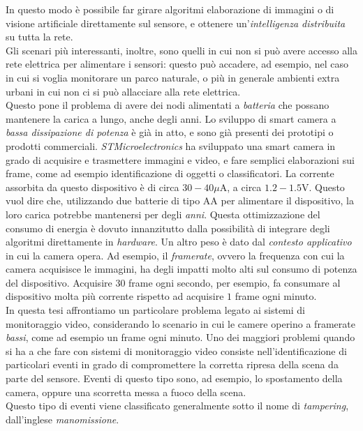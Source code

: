 In questo modo \`e possibile far girare algoritmi elaborazione di immagini o di visione artificiale direttamente sul sensore, e ottenere un'\textit{intelligenza distribuita} su tutta la rete.\\
Gli scenari pi\`u interessanti, inoltre, sono quelli in cui non si pu\`o avere accesso alla rete elettrica per alimentare i sensori: questo pu\`o accadere, ad esempio, nel caso in cui si voglia monitorare un parco naturale, o pi\`u in generale ambienti extra urbani in cui non ci si pu\`o allacciare alla rete elettrica.\\
Questo pone il problema di avere dei nodi alimentati a \textit{batteria} che possano mantenere la carica a lungo, anche degli anni.
Lo sviluppo di smart camera a \textit{bassa dissipazione di potenza} \`e gi\`a in atto, e sono gi\`a presenti dei prototipi o prodotti commerciali.
\textit{STMicroelectronics} ha sviluppato una smart camera in grado di acquisire e trasmettere immagini e video, e fare semplici elaborazioni sui frame, come ad esempio identificazione di oggetti o classificatori.
La corrente assorbita da questo dispositivo \`e di circa $30-40 \mu \text{A}$, a circa $1.2-1.5 \text{V}$.
Questo vuol dire che, utilizzando due batterie di tipo AA per alimentare il dispositivo, la loro carica potrebbe mantenersi per degli \textit{anni}.
Questa ottimizzazione del consumo di energia \`e dovuto innanzitutto dalla possibilit\`a di integrare degli algoritmi direttamente in \textit{hardware}.
Un altro peso \`e dato dal \textit{contesto applicativo} in cui la camera opera.
Ad esempio, il \textit{framerate}, ovvero la frequenza con cui la camera acquisisce le immagini, ha degli impatti molto alti sul consumo di potenza del dispositivo.
Acquisire $30$ frame ogni secondo, per esempio, fa consumare al dispositivo molta pi\`u corrente rispetto ad acquisire $1$ frame ogni minuto.\\
In questa tesi affrontiamo un particolare problema legato ai sistemi di monitoraggio video, considerando lo scenario in cui le camere operino a framerate \textit{bassi}, come ad esempio un frame ogni minuto.
Uno dei maggiori problemi quando si ha a che fare con sistemi di monitoraggio video consiste nell'identificazione di particolari eventi in grado di compromettere la corretta ripresa della scena da parte del sensore.
Eventi di questo tipo sono, ad esempio, lo spostamento della camera, oppure una scorretta messa a fuoco della scena.\\
Questo tipo di eventi viene classificato generalmente sotto il nome di \textit{tampering}, dall'inglese \textit{manomissione}.
